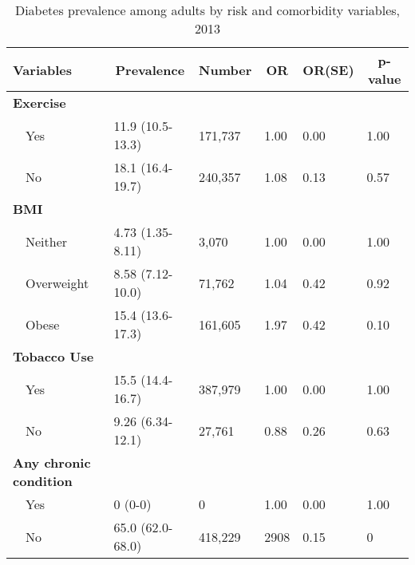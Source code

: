  
\begin{table}[H]
\caption{Diabetes prevalence  among adults by risk and comorbidity variables, 2013\label{tab:riskComo.tabl}} 
\begin{center}
\begin{tabular}{llllll}
\hline\hline
\multicolumn{1}{l}{Variables}&\multicolumn{1}{c}{Prevalence}&\multicolumn{1}{c}{Number}&\multicolumn{1}{c}{OR}&\multicolumn{1}{c}{OR(SE)}&\multicolumn{1}{c}{p-value}\tabularnewline
\hline
{\bfseries Exercise}&&&&&\tabularnewline
~~Yes&11.9 (10.5-13.3)&171,737&1.00&0.00&1.00\tabularnewline
~~No&18.1 (16.4-19.7)&240,357&1.08&0.13&0.57\tabularnewline
\hline
{\bfseries BMI}&&&&&\tabularnewline
~~Neither&4.73 (1.35-8.11)&  3,070&1.00&0.00&1.00\tabularnewline
~~Overweight&8.58 (7.12-10.0)& 71,762&1.04&0.42&0.92\tabularnewline
~~Obese&15.4 (13.6-17.3)&161,605&1.97&0.42&0.10\tabularnewline
\hline
{\bfseries Tobacco Use}&&&&&\tabularnewline
~~Yes&15.5 (14.4-16.7)&387,979&1.00&0.00&1.00\tabularnewline
~~No&9.26 (6.34-12.1)& 27,761&0.88&0.26&0.63\tabularnewline
\hline
{\bfseries Any chronic condition}&&&&&\tabularnewline
~~Yes&0 (0-0)&      0&1.00&0.00&1.00\tabularnewline
~~No&65.0 (62.0-68.0)&418,229&2908&0.15&0\tabularnewline
\hline
\end{tabular}\end{center}

\end{table}

 
